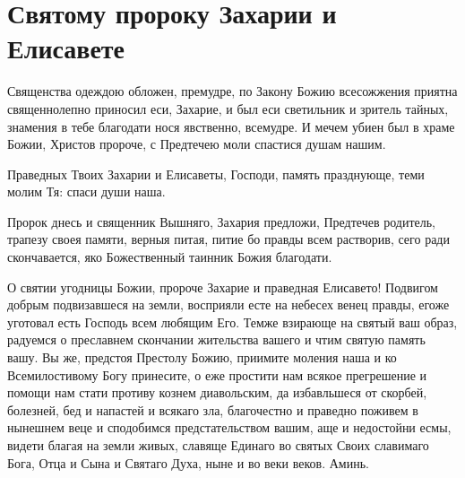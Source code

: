 \section{Святому пророку Захарии и Елисавете}\begin{mymulticols}



Священства одеждою обложен, премудре, по Закону Божию всесожжения приятна священнолепно приносил еси, Захарие, и был еси светильник и зритель тайных, знамения в тебе благодати нося явственно, всемудре. И мечем убиен был в храме Божии, Христов пророче, с Предтечею моли спастися душам нашим.




Праведных Твоих Захарии и Елисаветы, Господи, память празднующе, теми молим Тя: спаси души наша.




Пророк днесь и священник Вышняго, Захария предложи, Предтечев родитель, трапезу своея памяти, верныя питая, питие бо правды всем растворив, сего ради скончавается, яко Божественный таинник Божия благодати.




О святии угодницы Божии, пророче Захарие и праведная Елисавето! Подвигом добрым подвизавшеся на земли, восприяли есте на небесех венец правды, егоже уготовал есть Господь всем любящим Его. Темже взирающе на святый ваш образ, радуемся о преславнем скончании жительства вашего и чтим святую память вашу. Вы же, предстоя Престолу Божию, приимите моления наша и ко Всемилостивому Богу принесите, о еже простити нам всякое прегрешение и помощи нам стати противу кознем диавольским, да избавльшеся от скорбей, болезней, бед и напастей и всякаго зла, благочестно и праведно поживем в нынешнем веце и сподобимся предстательством вашим, аще и недостойни есмы, видети благая на земли живых, славяще Единаго во святых Своих славимаго Бога, Отца и Сына и Святаго Духа, ныне и во веки веков. Аминь.

\end{mymulticols}

